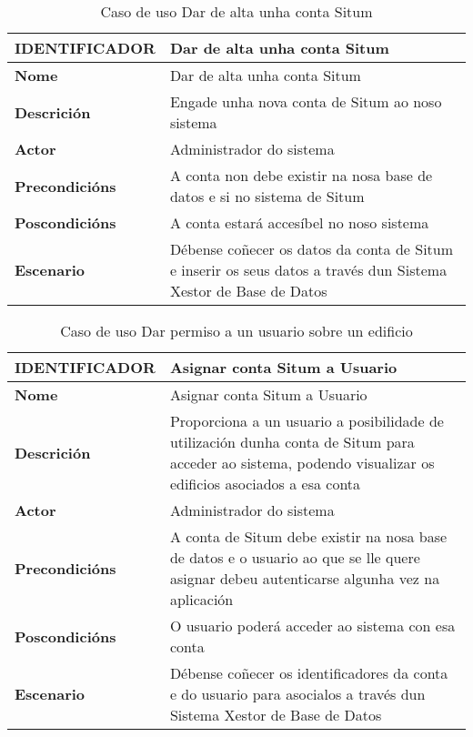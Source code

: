 \begin{table}[tbp]
	\begin{tabular}{|l|p{10cm}|}
		\hline 
		\textbf{IDENTIFICADOR}	& \textbf{Dar de alta unha conta Situm} \\ 
		\hline 
		\textbf{Nome} & Dar de alta unha conta Situm \\ 
		\hline 
		\textbf{Descrición} & Engade unha nova conta de Situm ao noso sistema \\ 
		\hline 
		\textbf{Actor} & Administrador do sistema \\ 
		\hline 
		\textbf{Precondicións} & A conta non debe existir na nosa base de datos e si no sistema de Situm \\ 
		\hline 
		\textbf{Poscondicións} & A conta estará accesíbel no noso sistema \\ 
		\hline 
		\textbf{Escenario} & Débense coñecer os datos da conta de Situm e inserir os seus datos a través dun Sistema Xestor de Base de Datos \\ 
		\hline 
	\end{tabular}
	\caption{Caso de uso Dar de alta unha conta Situm}
	\label{tab:cuDarAltaContaSitum}
\end{table}

\begin{table}[tbp]
	\begin{tabular}{|l|p{10cm}|}
		\hline 
		\textbf{IDENTIFICADOR}	& \textbf{Asignar conta Situm a Usuario} \\ 
		\hline 
		\textbf{Nome} & Asignar conta Situm a Usuario \\ 
		\hline 
		\textbf{Descrición} & Proporciona a un usuario a posibilidade de utilización dunha conta de Situm para acceder ao sistema, podendo visualizar os edificios asociados a esa conta \\ 
		\hline 
		\textbf{Actor} & Administrador do sistema \\ 
		\hline 
		\textbf{Precondicións} & A conta de Situm debe existir na nosa base de datos e o usuario ao que se lle quere asignar debeu autenticarse algunha vez na aplicación \\ 
		\hline 
		\textbf{Poscondicións} & O usuario poderá acceder ao sistema con esa conta \\ 
		\hline 
		\textbf{Escenario} & Débense coñecer os identificadores da conta e do usuario para asocialos a través dun Sistema Xestor de Base de Datos \\ 
		\hline 
	\end{tabular}
	\caption{Caso de uso Dar permiso a un usuario sobre un edificio}
	\label{tab:cuAsignarContaSitumUsuario}
\end{table}